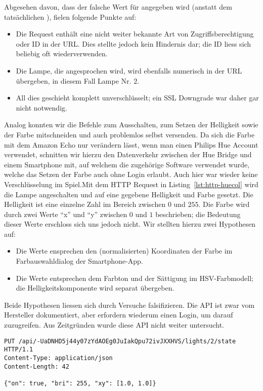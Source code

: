 \documentclass[11pt,a4paper]{scrartcl}
\begin{document}
Abgesehen davon, dass der falsche Wert für  angegeben wird (anstatt dem
tatsächlichen ), fielen folgende Punkte auf:
\begin{itemize}
\item Die Request enthält eine nicht weiter bekannte Art von Zugriffsberechtigung oder ID in
der URL. Dies stellte jedoch kein Hindernis dar; die ID liess sich beliebig oft
wiederverwenden.
\item Die Lampe, die angesprochen wird, wird ebenfalls numerisch in der URL übergeben, in
diesem Fall Lampe Nr. 2.
\item All dies geschieht komplett unverschlüsselt; ein SSL Downgrade war daher gar nicht
notwendig.
\end{itemize}
Analog konnten wir die Befehle zum Ausschalten, zum Setzen der Helligkeit sowie der Farbe
mitschneiden und auch problemlos selbst versenden. Da sich die Farbe mit dem Amazon Echo nur
verändern lässt, wenn man einen Philips Hue Account verwendet, schnitten wir hierzu den
Datenverkehr zwischen der Hue Bridge und einem Smartphone mit, auf welchem die zugehörige
Software verwendet wurde, welche das Setzen der Farbe auch ohne Login erlaubt. Auch hier war
wieder keine Verschlüsselung im Spiel.Mit dem HTTP Request in Listing~\ref{lst:http-huecol}
wird die Lampe angeschalten und auf eine gegebene Helligkeit und Farbe gesetzt. Die
Helligkeit ist eine einzelne Zahl im Bereich zwischen $0$ und $255$. Die Farbe wird durch
zwei Werte ``x'' und ``y'' zwischen $0$ und $1$ beschrieben; die Bedeutung dieser Werte
erschloss sich uns jedoch nicht. Wir stellten hierzu zwei Hypothesen auf:
\begin{itemize}
\item Die Werte ensprechen den (normalisierten) Koordinaten der Farbe im Farbauswahldialog
der Smartphone-App.
\item Die Werte entsprechen dem Farbton und der Sättigung im HSV-Farbmodell; die
Helligkeitskomponente wird separat übergeben.
\end{itemize}
Beide Hypothesen liessen sich durch Versuche falsifizieren. Die API ist zwar vom Hersteller
dokumentiert, aber erfordern wiederum einen Login, um darauf zuzugreifen.
\cite{philips:developer} Aus Zeitgründen wurde diese API nicht weiter untersucht.
\begin{lstlisting}[label={lst:http-huecol},caption={Ein HTTP Request für bunte Lampen.},float,floatplacement=H]
PUT /api/-UaDNHD5j44y07zYdAOEg0JuIakQpu72ivJXXHVS/lights/2/state HTTP/1.1
Content-Type: application/json
Content-Length: 42

{"on": true, "bri": 255, "xy": [1.0, 1.0]}
\end{lstlisting}
\end{document}
